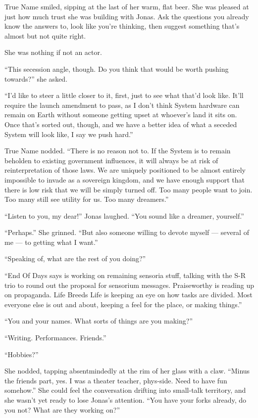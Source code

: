 True Name smiled, sipping at the last of her warm, flat beer. She was pleased at just how much trust she was building with Jonas. Ask the questions you already know the answers to, look like you're thinking, then suggest something that's almost but not quite right.

She was nothing if not an actor.

``This secession angle, though. Do you think that would be worth pushing towards?'' she asked.

``I'd like to steer a little closer to it, first, just to see what that'd look like. It'll require the launch amendment to pass, as I don't think System hardware can remain on Earth without someone getting upset at whoever's land it sits on. Once that's sorted out, though, and we have a better idea of what a seceded System will look like, I say we push hard.''

True Name nodded. ``There is no reason not to. If the System is to remain beholden to existing government influences, it will always be at risk of reinterpretation of those laws. We are uniquely positioned to be almost entirely impossible to invade as a sovereign kingdom, and we have enough support that there is low risk that we will be simply turned off. Too many people want to join. Too many still see utility for us. Too many dreamers.''

``Listen to you, my dear!'' Jonas laughed. ``You sound like a dreamer, yourself.''

``Perhaps.'' She grinned. ``But also someone willing to devote myself — several of me — to getting what I want.''

``Speaking of, what are the rest of you doing?''

``End Of Days says is working on remaining sensoria stuff, talking with the S-R trio to round out the proposal for sensorium messages. Praiseworthy is reading up on propaganda. Life Breeds Life is keeping an eye on how tasks are divided. Most everyone else is out and about, keeping a feel for the place, or making things.''

``You and your names. What sorts of things are you making?''

``Writing. Performances. Friends.''

``Hobbies?''

She nodded, tapping absentmindedly at the rim of her glass with a claw. ``Minus the friends part, yes. I was a theater teacher, phys-side. Need to have fun somehow.'' She could feel the conversation drifting into small-talk territory, and she wasn't yet ready to lose Jonas's attention. ``You have your forks already, do you not? What are they working on?''

